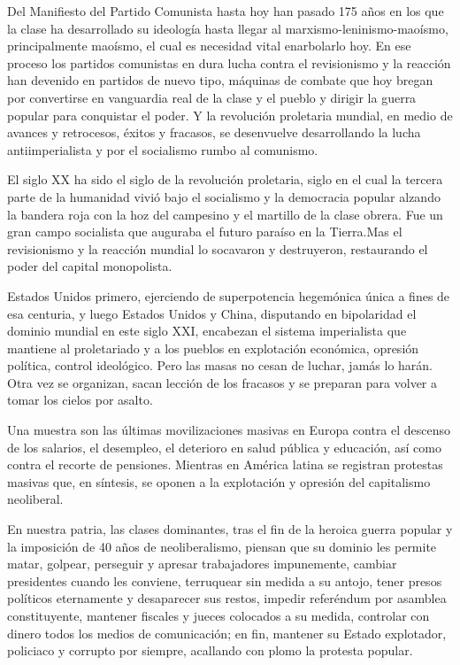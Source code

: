 \documentclass[
  letterpaper,
  DIV=11,
  numbers=noendperiod]{scrartcl}
\begin{document}
Del Manifiesto del Partido Comunista hasta hoy han pasado 175 años en
los que la clase ha desarrollado su ideología hasta llegar al
marxismo-leninismo-maoísmo, principalmente maoísmo, el cual es necesidad
vital enarbolarlo hoy. En ese proceso los partidos comunistas en dura
lucha contra el revisionismo y la reacción han devenido en partidos de
nuevo tipo, máquinas de combate que hoy bregan por convertirse en
vanguardia real de la clase y el pueblo y dirigir la guerra popular para
conquistar el poder. Y la revolución proletaria mundial, en medio de
avances y retrocesos, éxitos y fracasos, se desenvuelve desarrollando la
lucha antiimperialista y por el socialismo rumbo al comunismo.

El siglo XX ha sido el siglo de la revolución proletaria, siglo en el
cual la tercera parte de la humanidad vivió bajo el socialismo y la
democracia popular alzando la bandera roja con la hoz del campesino y el
martillo de la clase obrera. Fue un gran campo socialista que auguraba
el futuro paraíso en la Tierra.Mas el revisionismo y la reacción mundial
lo socavaron y destruyeron, restaurando el poder del capital
monopolista.

Estados Unidos primero, ejerciendo de superpotencia hegemónica única a
fines de esa centuria, y luego Estados Unidos y China, disputando en
bipolaridad el dominio mundial en este siglo XXI, encabezan el sistema
imperialista que mantiene al proletariado y a los pueblos en explotación
económica, opresión política, control ideológico. Pero las masas no
cesan de luchar, jamás lo harán. Otra vez se organizan, sacan lección de
los fracasos y se preparan para volver a tomar los cielos por asalto.

Una muestra son las últimas movilizaciones masivas en Europa contra el
descenso de los salarios, el desempleo, el deterioro en salud pública y
educación, así como contra el recorte de pensiones. Mientras en América
latina se registran protestas masivas que, en síntesis, se oponen a la
explotación y opresión del capitalismo neoliberal.

En nuestra patria, las clases dominantes, tras el fin de la heroica
guerra popular y la imposición de 40 años de neoliberalismo, piensan que
su dominio les permite matar, golpear, perseguir y apresar trabajadores
impunemente, cambiar presidentes cuando les conviene, terruquear sin
medida a su antojo, tener presos políticos eternamente y desaparecer sus
restos, impedir referéndum por asamblea constituyente, mantener fiscales
y jueces colocados a su medida, controlar con dinero todos los medios de
comunicación; en fin, mantener su Estado explotador, policiaco y
corrupto por siempre, acallando con plomo la protesta popular.
\end{document}
